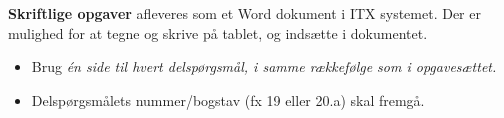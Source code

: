 {\bf Skriftlige opgaver} afleveres som et Word dokument i ITX systemet.
Der er mulighed for at tegne og skrive på tablet, og indsætte i dokumentet.
\begin{itemize}
    \item Brug \emph{én side til hvert delspørgsmål, i samme rækkefølge som i opgavesættet.} 
    \item Delspørgsmålets nummer/bogstav (fx 19 eller 20.a) skal fremgå.
\end{itemize}
